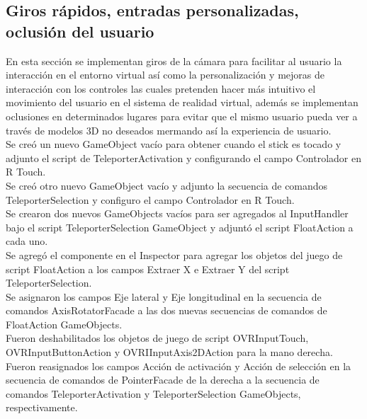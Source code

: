 \subsection{Giros rápidos, entradas personalizadas, oclusión del usuario}
En esta sección se implementan giros de la cámara para facilitar al usuario la interacción en el entorno virtual así como la personalización y mejoras de interacción con los controles las cuales pretenden hacer más intuitivo el movimiento del usuario en el sistema de realidad virtual, además se implementan oclusiones en determinados lugares para evitar que el mismo usuario pueda ver a través de modelos 3D no deseados mermando así la experiencia de usuario.\\

Se creó un nuevo GameObject vacío para obtener  cuando el stick es tocado y adjunto el script de TeleporterActivation y configurando el campo Controlador en R Touch.\\

Se creó otro nuevo GameObject vacío y adjunto la secuencia de comandos TeleporterSelection y configuro el campo Controlador en R Touch.\\
 
Se crearon dos nuevos GameObjects vacíos para ser agregados al InputHandler bajo el script TeleporterSelection GameObject y  adjuntó el script FloatAction a cada uno.\\

Se agregó el componente en el Inspector para agregar los objetos del juego de script FloatAction a los campos Extraer X e Extraer Y del script TeleporterSelection.\\

Se asignaron los campos Eje lateral y Eje longitudinal en la secuencia de comandos AxisRotatorFacade a las dos nuevas secuencias de comandos de FloatAction GameObjects.\\

Fueron deshabilitados los objetos de juego de script OVRInputTouch, OVRInputButtonAction y OVRIInputAxis2DAction para la mano derecha.\\

Fueron reasignados los campos Acción de activación y Acción de selección en la secuencia de comandos de PointerFacade de la derecha a la secuencia de comandos TeleporterActivation y TeleporterSelection GameObjects, respectivamente.\\

